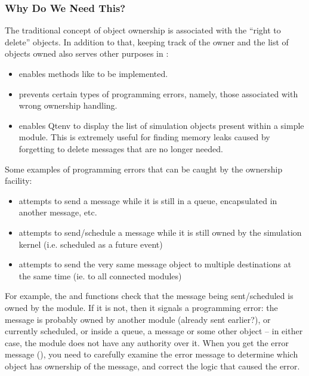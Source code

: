 \subsubsection{Why Do We Need This?}
\label{sec:sim-lib:why-we-need-ownership}

The traditional concept of object ownership is associated with
the ``right to delete'' objects. In addition to that,
keeping track of the owner and the list of objects owned also
serves other purposes in {\opp}:

\begin{itemize}
    \item enables methods like  to be implemented.

    \item prevents certain types of programming errors, namely,
    those associated with wrong ownership handling.

    \item enables Qtenv to display the list of simulation objects
    present within a simple module. This is extremely useful for finding
    memory leaks caused by forgetting to delete messages that are
    no longer needed.
\end{itemize}

Some examples of programming errors that can be caught
by the ownership facility:

\begin{itemize}
    \item attempts to send a message while it is still in a queue,
    encapsulated in another message, etc.

    \item attempts to send/schedule a message while it is still owned
    by the simulation kernel (i.e. scheduled as a future event)

    \item attempts to send the very same message object to multiple
    destinations at the same time (ie. to all connected modules)
\end{itemize}

For example, the  and  functions check
that the message being sent/scheduled is owned by the module.
If it is not, then it signals a programming error: the message is probably
owned by another module (already sent earlier?), or currently scheduled, or
inside a queue, a message or some other object -- in either case, the
module does not have any authority over it. When you get the error message
(), you need to carefully examine the error
message to determine which object has ownership of the message, and correct
the logic that caused the error.

